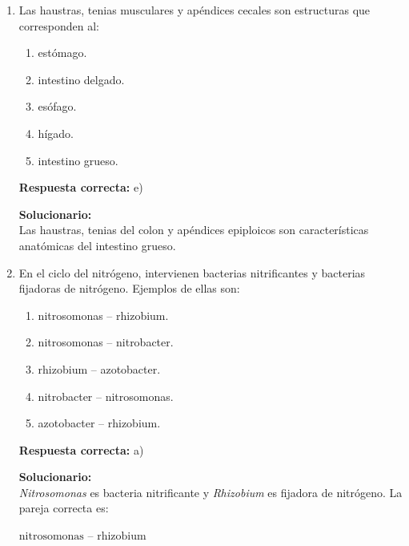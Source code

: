 \begin{enumerate}
	\vspace{2mm}
	\textbf{Solucionario:}\\
	En los ovovivíparos, los huevos permanecen dentro del cuerpo de la madre hasta su eclosión, pero el embrión se nutre del huevo, no directamente de la madre.
	
	\vspace{6mm}
	
	\item Las haustras, tenias musculares y apéndices cecales son estructuras que corresponden al:
	\begin{enumerate}[label=\alph*)]
		\item estómago.
		\item intestino delgado.
		\item esófago.
		\item hígado.
		\item intestino grueso.
	\end{enumerate}
	\textbf{Respuesta correcta:} e)
	
	\vspace{2mm}
	\textbf{Solucionario:}\\
	Las haustras, tenias del colon y apéndices epiploicos son características anatómicas del intestino grueso.
	
	\vspace{6mm}
	
	\item En el ciclo del nitrógeno, intervienen bacterias nitrificantes y bacterias fijadoras de nitrógeno. Ejemplos de ellas son:
	\begin{enumerate}[label=\alph*)]
		\item nitrosomonas -- rhizobium.
		\item nitrosomonas -- nitrobacter.
		\item rhizobium -- azotobacter.
		\item nitrobacter -- nitrosomonas.
		\item azotobacter -- rhizobium.
	\end{enumerate}
	\textbf{Respuesta correcta:} a)
	
	\vspace{2mm}
	\textbf{Solucionario:}\\
	\textit{Nitrosomonas} es bacteria nitrificante y \textit{Rhizobium} es fijadora de nitrógeno. La pareja correcta es:
	
	$\text{nitrosomonas -- rhizobium}$
	
	\vspace{6mm}
	

\end{enumerate}
